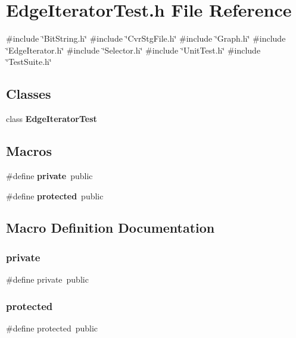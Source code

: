 \section{Edge\+Iterator\+Test.\+h File Reference}
\label{EdgeIteratorTest_8h}
{\ttfamily \#include \char`\"{}Bit\+String.\+h\char`\"{}}\newline
{\ttfamily \#include \char`\"{}Cvr\+Stg\+File.\+h\char`\"{}}\newline
{\ttfamily \#include \char`\"{}Graph.\+h\char`\"{}}\newline
{\ttfamily \#include \char`\"{}Edge\+Iterator.\+h\char`\"{}}\newline
{\ttfamily \#include \char`\"{}Selector.\+h\char`\"{}}\newline
{\ttfamily \#include \char`\"{}Unit\+Test.\+h\char`\"{}}\newline
{\ttfamily \#include \char`\"{}Test\+Suite.\+h\char`\"{}}\newline
\subsection*{Classes}
\begin{DoxyCompactItemize}
\item 
class \textbf{ Edge\+Iterator\+Test}
\end{DoxyCompactItemize}
\subsection*{Macros}
\begin{DoxyCompactItemize}
\item 
\#define \textbf{ private}~public
\item 
\#define \textbf{ protected}~public
\end{DoxyCompactItemize}


\subsection{Macro Definition Documentation}
\mbox{\label{EdgeIteratorTest_8h_a6a1d6e1a12975a4e9a0b5b952e79eaad}} 
\subsubsection{private}
{\footnotesize\ttfamily \#define private~public}

\mbox{\label{EdgeIteratorTest_8h_a363c8dcebb1777654ad1703136a14ec8}} 
\subsubsection{protected}
{\footnotesize\ttfamily \#define protected~public}

